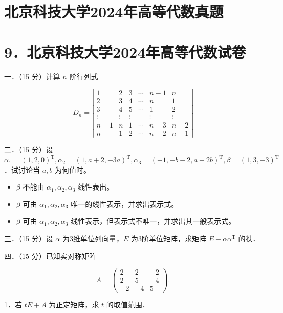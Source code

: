 \documentclass{article}
\begin{document}
\section*{北京科技大学2024年高等代数真题}
\section*{9．北京科技大学2024年高等代数试卷}
一．（15 分）计算 \(n\) 阶行列式

\[
D_{n}=\left|\begin{array}{cccccc}
1 & 2 & 3 & \cdots & n-1 & n \\
2 & 3 & 4 & \cdots & n & 1 \\
3 & 4 & 5 & \cdots & 1 & 2 \\
\vdots & \vdots & \vdots & & \vdots & \vdots \\
n-1 & n & 1 & \cdots & n-3 & n-2 \\
n & 1 & 2 & \cdots & n-2 & n-1
\end{array}\right|
\]

二．（15 分）设 \(\alpha_{1}=(1,2,0)^{\mathrm{T}}, \alpha_{2}=(1, a+2,-3 a)^{\mathrm{T}}, \alpha_{3}=(-1,-b-2, \bar{a}+2 b)^{\mathrm{T}}, \beta=(1,3,-3)^{\mathrm{T}}\) ．试讨论当 \(a, b\) 为何值时。

\begin{itemize}

  \item[1．] \(\beta\) 不能由 \(\alpha_{1}, \alpha_{2}, \alpha_{3}\) 线性表出。

  \item[2．] \(\beta\) 可由 \(\alpha_{1}, \alpha_{2}, \alpha_{3}\) 唯一的线性表示，并求出表示式。

  \item[3．] \(\beta\) 可由 \(\alpha_{1}, \alpha_{2}, \alpha_{3}\) 线性表示，但表示式不唯一，并求出其一般表示式。
\end{itemize}

三．（15 分）设 \(\alpha\) 为3维单位列向量，\(E\) 为3阶单位矩阵，求矩阵 \(E-\alpha \alpha^{\mathrm{T}}\) 的秩．

四．（15 分）已知实对称矩阵

\[
A=\left(\begin{array}{ccc}
2 & 2 & -2 \\
2 & 5 & -4 \\
-2 & -4 & 5
\end{array}\right) .
\]

1．若 \(t E+A\) 为正定矩阵，求 \(t\) 的取值范围．\\
\end{document}
